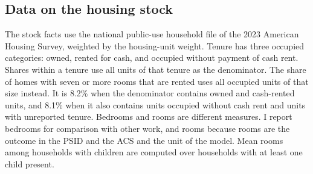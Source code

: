 \subsection{Data on the housing stock}

The stock facts use the national public-use household file of the 2023
American Housing Survey, weighted by the housing-unit weight. Tenure has
three occupied categories: owned, rented for cash, and occupied without
payment of cash rent. Shares within a tenure use all units of that tenure as
the denominator. The share of homes with seven or more rooms that are rented
uses all occupied units of that size instead. It is 8.2\% when the
denominator contains owned and cash-rented units, and 8.1\% when it also
contains units occupied without cash rent and units with unreported tenure.
Bedrooms and rooms are different measures. I report bedrooms for comparison
with other work, and rooms because rooms are the outcome in the PSID and the
ACS and the unit of the model. Mean rooms among households with children are
computed over households with at least one child present.
